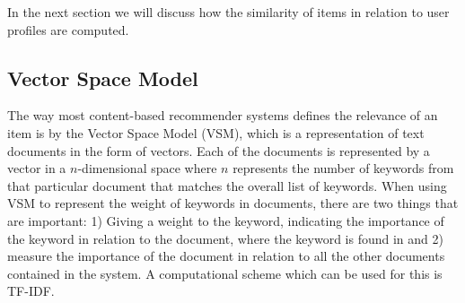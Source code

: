 
In the next section we will discuss how the similarity of items in relation to user profiles are computed.

\subsection{Vector Space Model}
The way most content-based recommender systems defines the relevance of an item is by the Vector Space Model (VSM), which is a representation of text documents in the form of vectors. Each of the documents is represented by a vector in a \(n\)-dimensional space where \(n\) represents the number of keywords from that particular document that matches the overall list of keywords.\newline
When using VSM to represent the weight of keywords in documents, there are two things that are important: 1) Giving a weight to the keyword, indicating the importance of the keyword in relation to the document, where the keyword is found in and 2) measure the importance of the document in relation to all the other documents contained in the system. A computational scheme which can be used for this is TF-IDF. \newline

